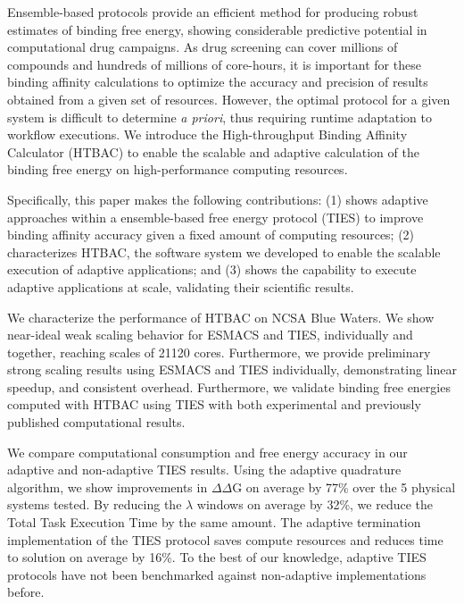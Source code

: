 Ensemble-based protocols provide an efficient method for producing robust
estimates of binding free energy, showing considerable predictive potential in
computational drug campaigns. As drug screening can cover millions of
compounds and hundreds of millions of core-hours, it is important for these
binding affinity calculations to optimize the accuracy and precision of
results obtained from a given set of resources. However, the optimal protocol
for a given system is difficult to determine {\it a priori}, thus requiring
runtime adaptation to workflow executions. We introduce the High-throughput
Binding Affinity Calculator (HTBAC) to enable the scalable and adaptive
calculation of the binding free energy on high-performance computing
resources.


Specifically, this paper makes the following contributions: (1) shows
adaptive approaches within a ensemble-based free energy protocol (TIES) to
improve binding affinity accuracy given a fixed amount of computing
resources; (2) characterizes HTBAC, the software system we developed to
enable the scalable execution of adaptive applications; and (3) shows the
capability to execute adaptive applications at scale, validating their
scientific results.

We characterize the performance of HTBAC on NCSA Blue Waters. We show
near-ideal weak scaling behavior for ESMACS and TIES, individually and
together, reaching scales of 21120 cores. Furthermore, we provide preliminary
strong scaling results using ESMACS and TIES individually, demonstrating
linear speedup, and consistent overhead. Furthermore, we validate binding
free energies computed with HTBAC using TIES with both experimental and
previously published computational results.


We compare computational consumption and free energy accuracy in our adaptive
and non-adaptive TIES results. Using the adaptive quadrature algorithm, we
show improvements in $\Delta \Delta$G on average by 77\% over the 5 physical
systems tested. By reducing the $\lambda$ windows on average by 32\%, we
reduce the Total Task Execution Time by the same amount. The adaptive
termination implementation of the TIES protocol saves compute resources and
reduces time to solution on average by 16\%. To the best of our knowledge,
adaptive TIES protocols have not been benchmarked against non-adaptive
implementations before.

